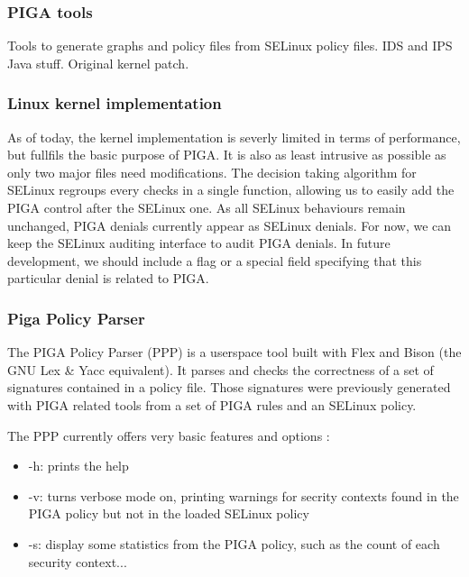 \documentclass[pdftex,a4paper,titlepage,11pt]{article}
\begin{document}
\subsubsection{PIGA tools}

Tools to generate graphs and policy files from SELinux policy files. IDS and IPS Java stuff. Original kernel patch.

\subsubsection{Linux kernel implementation}

As of today, the kernel implementation is severly limited in terms of performance, but fullfils the basic purpose of PIGA.
It is also as least intrusive as possible as only two major files need modifications. The decision taking algorithm for SELinux regroups every checks in a single function, allowing us to easily add the PIGA control after the SELinux one.
As all SELinux behaviours remain unchanged, PIGA denials currently appear as SELinux denials. For now, we can keep the SELinux auditing interface to audit PIGA denials. In future development, we should include a flag or a special field specifying that this particular denial is related to PIGA.

\subsubsection{Piga Policy Parser}

The PIGA Policy Parser (PPP) is a userspace tool built with Flex and Bison (the GNU Lex \& Yacc equivalent). It parses and checks the correctness of a set of signatures contained in a policy file. Those signatures were previously generated with PIGA related tools from a set of PIGA rules and an SELinux policy.

The PPP currently offers very basic features and options :
\begin{itemize}
	\item -h: prints the help
	\item -v: turns verbose mode on, printing warnings for secrity contexts found in the PIGA policy but not in the loaded SELinux policy
	\item -s: display some statistics from the PIGA policy, such as the count of each security context...
\end{itemize}

\smallskip
\end{document}
